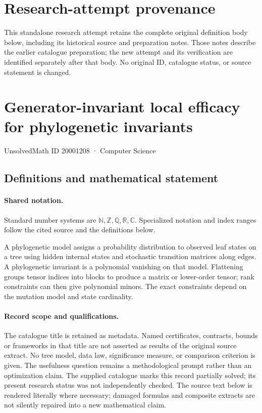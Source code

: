 \documentclass[11pt]{article}
\begin{document}
\section*{Research-attempt provenance}
This standalone research attempt retains the complete original definition body below,
including its historical source and preparation notes. Those notes describe the
earlier catalogue preparation; the new attempt and its verification are identified
separately after that body. No original ID, catalogue status, or source statement is changed.

\section{Generator-invariant local efficacy for phylogenetic invariants}\label{20001208}
{\small UnsolvedMath ID 20001208 · Computer Science}
\subsection{Definitions and mathematical statement}

\paragraph{Shared notation.}Standard number systems are $\mathbb N,\mathbb Z,\mathbb Q,\mathbb R,\mathbb C$. Specialized notation and index ranges follow the cited source and the definitions below.


A phylogenetic model assigns a probability distribution to observed leaf states on a tree using hidden internal states and stochastic transition matrices along edges. A phylogenetic invariant is a polynomial vanishing on that model. Flattening groups tensor indices into blocks to produce a matrix or lower-order tensor; rank constraints can then give polynomial minors. The exact constraints depend on the mutation model and state cardinality.
\paragraph{Record scope and qualifications.}
The catalogue title is retained as metadata. Named certificates, contracts, bounds or frameworks in that title are not asserted as results of the original source extract.
No tree model, data law, significance measure, or comparison criterion is given. The usefulness question remains a methodological prompt rather than an optimization claim. The supplied catalogue marks this record partially solved; its present research status was not independently checked.
The source text below is rendered literally where necessary; damaged formulas and composite extracts are not silently repaired into a new mathematical claim.
\end{document}

